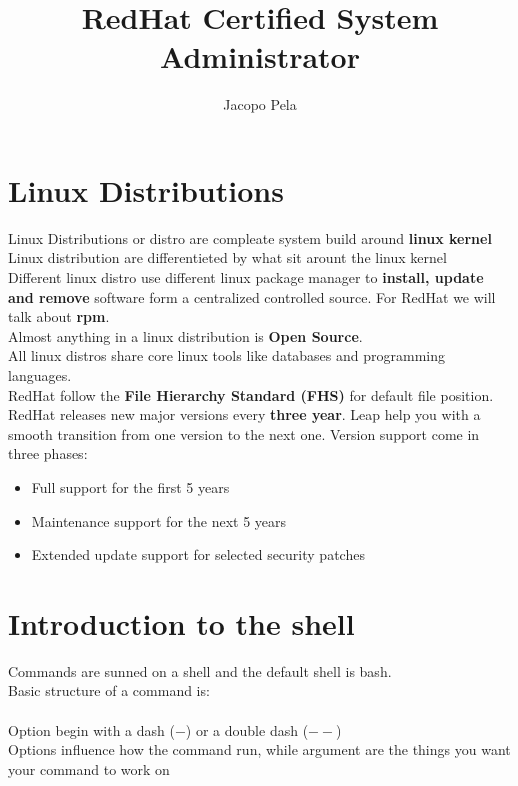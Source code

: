 \documentclass[12pt, letterpaper, twoside]{article}
\title{RedHat Certified System Administrator}
\author{Jacopo Pela}
\begin{document}
\begin{titlepage}
\maketitle
\end{titlepage}

\tableofcontents
\newpage

\section{Linux Distributions}
Linux Distributions or distro are compleate system build around \textbf{linux kernel}\\
Linux distribution are differentieted by what sit arount the linux kernel\\
Different linux distro use different linux package manager to \textbf{install, update and remove} software form a centralized controlled source.
For RedHat we will talk about \textbf{rpm}.\\
Almost anything in a linux distribution is \textbf{Open Source}.\\
All linux distros share core linux tools like databases and programming languages.\\
RedHat follow the \textbf{File Hierarchy Standard (FHS)} for default file position.\\
RedHat releases new major versions every \textbf{three year}. Leap help you with a smooth transition from one version to the next one.
Version support come in three phases:
\begin{itemize}
	\item Full support for the first 5 years
	\item Maintenance support for the next 5 years
	\item Extended update support for selected security patches
\end{itemize}

\section{Introduction to the shell}
Commands are sunned on a shell and the default shell is bash.\\
Basic structure of a command is:\\

\\

Option begin with a dash ($-$) or a double dash ($--$)\\
Options influence how the command run, while argument are the things you want your command to work on\\
\end{document}
